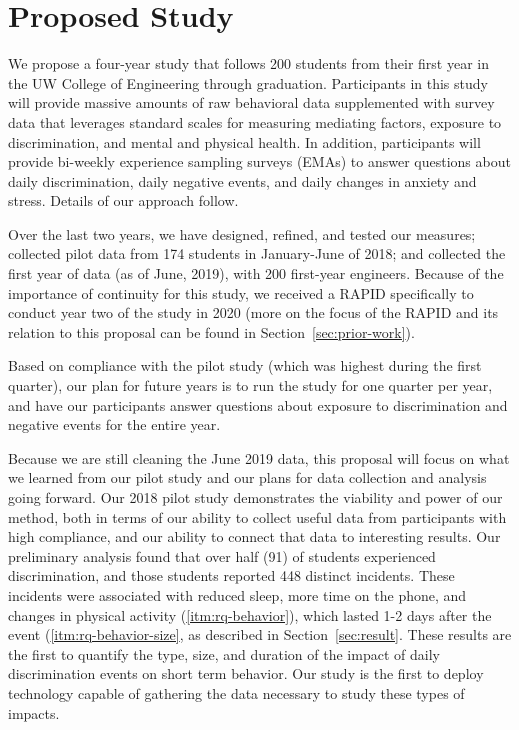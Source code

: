 \section{Proposed Study}
\label{sec:study}
\noindent We propose a four-year study that follows 200 students from their first year in the UW College of Engineering through graduation. Participants in this study will provide massive amounts of raw behavioral data supplemented with survey data that leverages standard scales for measuring mediating factors, exposure to discrimination, and mental and physical health. In addition, participants will provide bi-weekly experience sampling surveys  (EMAs) to answer questions about daily discrimination, daily negative events, and daily changes in anxiety and stress. Details of our approach  follow.

Over the last two years, we have designed, refined, and tested our measures; collected pilot data from 174 students in January-June of 2018; and collected the first year of data (as of June, 2019), with 200 first-year engineers. Because of the importance of continuity for this study, we received a RAPID specifically to conduct year two of the study in 2020 (more on the focus of the RAPID and its relation to this proposal can be found in Section~\ref{sec:prior-work}).  

Based on compliance with the pilot study (which was highest during the first quarter), our plan for future years is to run the study for one quarter per year, and have our participants answer questions about exposure to discrimination and negative events for the entire year.  

Because we are still cleaning the June 2019 data, this proposal will focus on what we learned from our pilot study and our plans for data collection and analysis going forward.  Our 2018 pilot study demonstrates the viability and power of our method, both in terms of our ability to collect useful data from participants with high compliance, and our ability to connect that data to interesting results. Our preliminary analysis found that over half (91) of students experienced discrimination, and those students reported 448 distinct incidents. These incidents were associated with reduced sleep, more time on the phone, and changes in physical activity (\ref{itm:rq-behavior}), which lasted 1-2 days after the event (\ref{itm:rq-behavior-size}, as described in Section~\ref{sec:result}. These results are the first to quantify the type, size, and duration of the impact of daily discrimination events on short term behavior. Our study is the first to deploy technology capable of gathering the data necessary to study these types of impacts.

